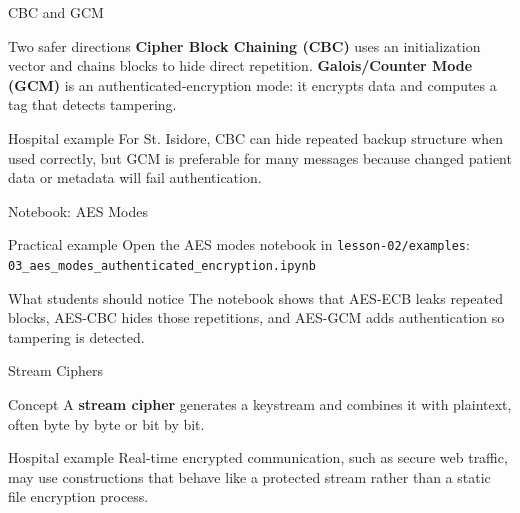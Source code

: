 \documentclass[presentation]{beamer}
\begin{document}
\begin{frame}[c]{CBC and GCM}
\begin{block}{Two safer directions}
\textbf{Cipher Block Chaining (CBC)} uses an initialization vector and chains blocks to hide direct
repetition. \textbf{Galois/Counter Mode (GCM)} is an authenticated-encryption mode: it encrypts data
and computes a tag that detects tampering.
\end{block}

\begin{exampleblock}{Hospital example}
For St. Isidore, CBC can hide repeated backup structure when used correctly, but GCM is preferable
for many messages because changed patient data or metadata will fail authentication.
\end{exampleblock}
\end{frame}

\begin{frame}[c]{Notebook: AES Modes}
\begin{block}{Practical example}
Open the AES modes notebook in \texttt{lesson-02/examples}:\\
\texttt{03\_aes\_modes\_authenticated\_encryption.ipynb}
\end{block}

\begin{exampleblock}{What students should notice}
The notebook shows that AES-ECB leaks repeated blocks, AES-CBC hides those repetitions, and AES-GCM
adds authentication so tampering is detected.
\end{exampleblock}
\end{frame}

\begin{frame}[c]{Stream Ciphers}
\begin{block}{Concept}
A \textbf{stream cipher} generates a keystream and combines it with plaintext, often byte by byte or
bit by bit.
\end{block}

\begin{exampleblock}{Hospital example}
Real-time encrypted communication, such as secure web traffic, may use constructions that behave
like a protected stream rather than a static file encryption process.
\end{exampleblock}
\end{frame}
\end{document}
